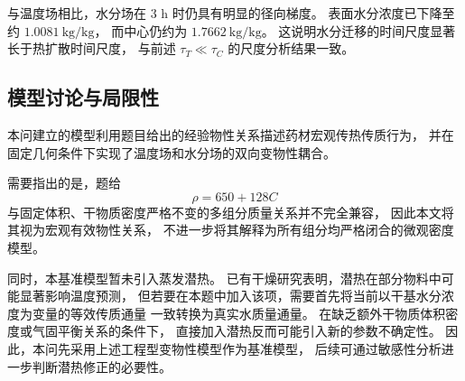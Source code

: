 \documentclass[UTF8,a4paper,12pt]{ctexart}
\begin{document}
与温度场相比，水分场在 3 h 时仍具有明显的径向梯度。
表面水分浓度已下降至约 $1.0081~\mathrm{kg/kg}$，
而中心仍约为 $1.7662~\mathrm{kg/kg}$。
这说明水分迁移的时间尺度显著长于热扩散时间尺度，
与前述 $\tau_T\ll\tau_C$ 的尺度分析结果一致。

\subsection{模型讨论与局限性}

本问建立的模型利用题目给出的经验物性关系描述药材宏观传热传质行为，
并在固定几何条件下实现了温度场和水分场的双向变物性耦合。

需要指出的是，题给
\begin{equation}
\rho=650+128C
\end{equation}
与固定体积、干物质密度严格不变的多组分质量关系并不完全兼容，
因此本文将其视为宏观有效物性关系，
不进一步将其解释为所有组分均严格闭合的微观密度模型。

同时，本基准模型暂未引入蒸发潜热。
已有干燥研究表明，潜热在部分物料中可能显著影响温度预测，
但若要在本题中加入该项，需要首先将当前以干基水分浓度为变量的等效传质通量
一致转换为真实水质量通量。
在缺乏额外干物质体积密度或气固平衡关系的条件下，
直接加入潜热反而可能引入新的参数不确定性。
因此，本问先采用上述工程型变物性模型作为基准模型，
后续可通过敏感性分析进一步判断潜热修正的必要性。
\end{document}
